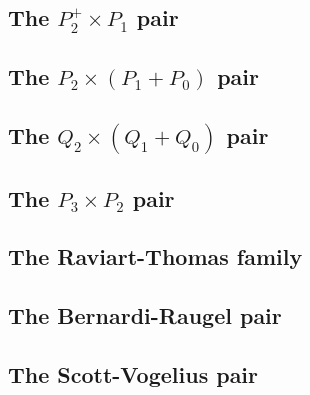 \subsection{The ${ P}_2^+\times P_{1}$ pair \label{ss:p2pp1}}


\subsection{The ${ P}_2\times (P_1+P_0)$ pair} \label{ss:p2p1p0}


\subsection{The ${ Q}_2\times (Q_1+Q_0)$ pair} \label{ss:q2q1q0}


\subsection{The ${ P}_3\times P_2$ pair} \label{ss:p3p2}


\subsection{The Raviart-Thomas family} \label{ss:raviart_thomas}


\subsection{The Bernardi-Raugel pair} \label{ss:bernardi_raugel}


\subsection{The Scott-Vogelius pair} \label{ss:scott_vogelius}



